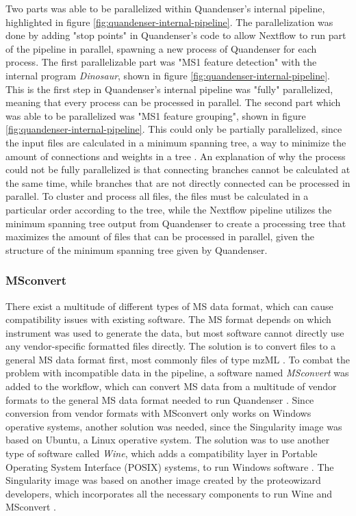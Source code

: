 Two parts was able to be parallelized within Quandenser's internal pipeline, highlighted in figure \ref{fig:quandenser-internal-pipeline}. The parallelization was done by adding "stop points" in Quandenser's code to allow Nextflow to run part of the pipeline in parallel, spawning a new process of Quandenser for each process. The first parallelizable part was "MS1 feature detection" with the internal program \textit{Dinosaur}, shown in figure \ref{fig:quandenser-internal-pipeline}. This is the first step in Quandenser's internal pipeline was "fully" parallelized, meaning that every process can be processed in parallel. The second part which was able to be parallelized was "MS1 feature grouping", shown in figure \ref{fig:quandenser-internal-pipeline}. This could only be partially parallelized, since the input files are calculated in a minimum spanning tree, a way to minimize the amount of connections and weights in a tree \cite{min-span-tree}. An explanation of why the process could not be fully parallelized is that connecting branches cannot be calculated at the same time, while branches that are not directly connected can be processed in parallel. To cluster and process all files, the files must be calculated in a particular order according to the tree, while the Nextflow pipeline utilizes the minimum spanning tree output from Quandenser to create a processing tree that maximizes the amount of files that can be processed in parallel, given the structure of the minimum spanning tree given by Quandenser.

\subsubsection{MSconvert}
There exist a multitude of different types of MS data format, which can cause compatibility issues with existing software. The MS format depends on which instrument was used to generate the data, but most software cannot directly use any vendor-specific formatted files directly. The solution is to convert files to a general MS data format first, most commonly files of type mzML \cite{mzml-format}. To combat the problem with incompatible data in the pipeline, a software named \textit{MSconvert} was added to the workflow, which can convert MS data from a multitude of vendor formats to the general MS data format needed to run Quandenser \cite{proteowizard}. Since conversion from vendor formats with MSconvert only works on Windows operative systems, another solution was needed, since the Singularity image was based on Ubuntu, a Linux operative system. The solution was to use another type of software called \textit{Wine}, which adds a compatibility layer in Portable Operating System Interface (POSIX) systems, to run Windows software \cite{wine}. The Singularity image was based on another image created by the proteowizard developers, which incorporates all the necessary components to run Wine and MSconvert \cite{docker-image} \cite{docker-howto}.

